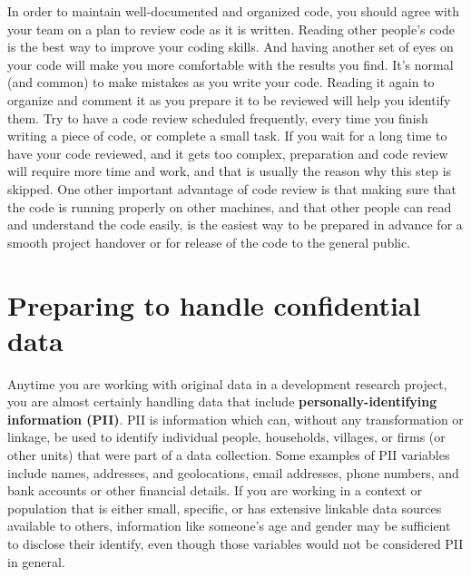 In order to maintain well-documented and organized code,
you should agree with your team on a plan to review code as it is written.
Reading other people's code is the best way to improve your coding skills.
And having another set of eyes on your code will make you more comfortable with the results you find.
It's normal (and common) to make mistakes as you write your code.
Reading it again to organize and comment it as you prepare it to be reviewed will help you identify them.
Try to have a code review scheduled frequently,
every time you finish writing a piece of code, or complete a small task.
If you wait for a long time to have your code reviewed, and it gets too complex,
preparation and code review will require more time and work,
and that is usually the reason why this step is skipped.
One other important advantage of code review is that
making sure that the code is running properly on other machines,
and that other people can read and understand the code easily,
is the easiest way to be prepared in advance for a smooth project handover
or for release of the code to the general public.


\section{Preparing to handle confidential data}

Anytime you are working with original data in a development research project,
you are almost certainly handling data that include
\textbf{personally-identifying	information (PII)}.
PII is information which can, without any transformation or linkage,
be used to identify individual people, households, villages,
or firms (or other units) that were part of a data collection.
Some examples of PII variables include names, addresses, and geolocations,
email addresses, phone numbers,
and bank accounts or other financial details.
If you are working in a context or population that is either small, specific,
or has extensive linkable data sources available to others,
information like someone's age and gender may be sufficient to
disclose their identify, even though those variables would not be considered PII in general.

